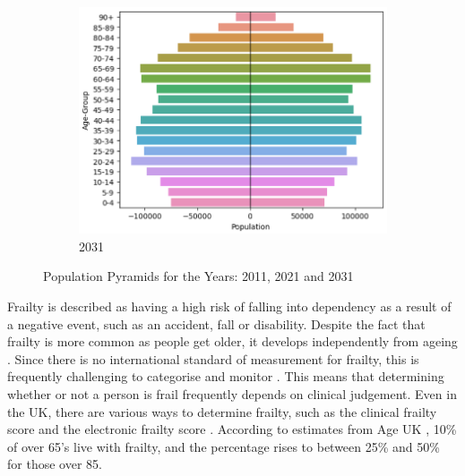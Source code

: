 \documentclass[../thesis.tex]{subfiles}
\begin{document}
\begin{figure}[h!]
\begin{subfigure}{0.33\textwidth}
    \includegraphics[width=\textwidth]{Chapters/Chapter1/Figures/Census2031.png}
    \caption{2031}
\end{subfigure}
    \caption{Population Pyramids for the Years: 2011, 2021 and 2031}
    \label{fig:PopulationPyramids}
\end{figure}





Frailty is described as having a high risk of falling into dependency as a result of a negative event, such as an accident, fall or disability. Despite the fact that frailty is more common as people get older, it develops independently from ageing \cite{Topinkova2008}. Since there is no international standard of measurement for frailty, this is frequently challenging to categorise and monitor \cite{Dent2016}. This means that determining whether or not a person is frail frequently depends on clinical judgement. Even in the UK, there are various ways to determine frailty, such as the clinical frailty score \cite{Rockwood2005} and the electronic frailty score \cite{NHSEnglanda}. According to estimates from Age UK \cite{AgeUK2020}, 10\% of over 65's live with frailty, and the percentage rises to between 25\% and 50\% for those over 85.
\end{document}
